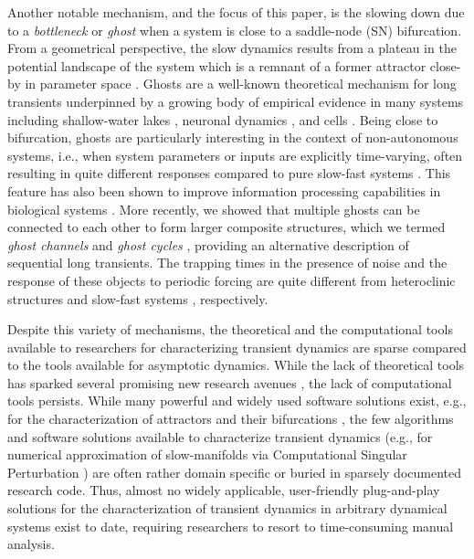 \documentclass{article}
\theoremstyle{definition}
\begin{document}
\begin{refsection}
Another notable mechanism, and the focus of this paper, is the slowing down due to a \textit{bottleneck} or \textit{ghost} \cite{Strogatz1989,Strogatz_2018} when a system is close to a saddle-node (SN) bifurcation. From a geometrical perspective, the slow dynamics results from a plateau in the potential landscape of the system which is a remnant of a former attractor close-by in parameter space \cite{Stanoev_2020,Koch_2024}. Ghosts are a well-known theoretical mechanism for long transients underpinned by a growing body of empirical evidence in many systems including shallow-water lakes \cite{VanGeest2007}, neuronal dynamics \cite{Izhikevich_2006}, and cells \cite{Stanoev2018,RodrguezMaroto2025,Mercadal2026}. Being close to bifurcation, ghosts are particularly interesting in the context of non-autonomous systems, i.e., when system parameters or inputs are explicitly time-varying, often resulting in quite different responses compared to pure slow-fast systems \cite{Koch2025}. This feature has also been shown to improve information processing capabilities in biological systems \cite{Stanoev_2020,Moor2023,Choi_2024}. More recently, we showed that multiple ghosts can be connected to each other to form larger composite structures, which we termed \textit{ghost channels} and \textit{ghost cycles} \cite{Koch_2024}, providing an alternative description of sequential long transients. The trapping times in the presence of noise and the response of these objects to periodic forcing are quite different from heteroclinic structures \cite{Koch_2024,Rabinovich2006} and slow-fast systems \cite{Koch2025}, respectively.

Despite this variety of mechanisms, the theoretical and the computational tools available to researchers for characterizing transient dynamics are sparse compared to the tools available for asymptotic dynamics. While the lack of theoretical tools has sparked several promising new research avenues \cite{Liu2022,Heggerud2024,Zheng2025}, the lack of computational tools persists. While many powerful and widely used software solutions exist, e.g., for the characterization of attractors and their bifurcations \cite{doedel1981,Ermentrout2002,Dhooge2003,veltz:hal-02902346,Datseris2023}, the few algorithms and software solutions available to characterize transient dynamics (e.g., for numerical approximation of slow-manifolds via Computational Singular Perturbation \cite{Galassi2022}) are often rather domain specific or buried in sparsely documented research code. Thus, almost no widely applicable, user-friendly plug-and-play solutions for the characterization of transient dynamics in arbitrary dynamical systems exist to date, requiring researchers to resort to time-consuming manual analysis. 


\end{refsection}
\end{document}

